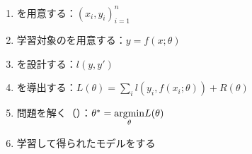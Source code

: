 \documentclass[../../../topic_machine-learning]{subfiles}
\begin{document}
\begin{enumerate}
  \item {}を用意する：$(x_i, y_i)_{i=1}^n$
  \item 学習対象のを用意する：$y = f(x;\theta)$
  \item {}を設計する：$l(y,y')$
  \item {}を導出する：$L(\theta) = \sum_i l(y_i, f(x_i;\theta)) + R(\theta)$
  \item {}問題を解く（）：$\theta^* = \underset{\theta}{\operatorname{argmin}} L(\theta)$
  \item 学習して得られたモデルをする
\end{enumerate}

\end{document}
